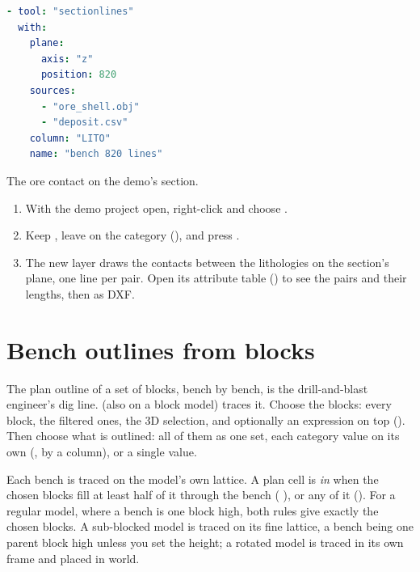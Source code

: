 \begin{lstlisting}[language=yaml]
- tool: "sectionlines"
  with:
    plane:
      axis: "z"
      position: 820
    sources:
      - "ore_shell.obj"
      - "deposit.csv"
    column: "LITO"
    name: "bench 820 lines"
\end{lstlisting}

\begin{tryit}
The ore contact on the demo's section.
\begin{enumerate}
\item With the demo project open, right-click  and choose
  .
\item Keep , leave  on the category (), and press
  .
\item The new layer draws the contacts between the lithologies on the section's plane, one line per
  pair. Open its attribute table () to see the pairs and their lengths, then
   as DXF.
\end{enumerate}
\end{tryit}

\section{Bench outlines from blocks}\label{sec:polygons-outlines}

The plan outline of a set of blocks, bench by bench, is the drill-and-blast engineer's dig line.
 (also  on a block
model) traces it. Choose the blocks: every block, the filtered ones, the 3D selection, and optionally
an expression on top (). Then choose what is outlined: all of them as one set, each
category value on its own (, by a column), or a single value.

Each bench is traced on the model's own lattice. A plan cell is \emph{in} when the chosen blocks fill
at least half of it through the bench ( ), or any of it (). For a regular
model, where a bench is one block high, both rules give exactly the chosen blocks. A sub-blocked
model is traced on its fine lattice, a bench being one parent block high unless you set the
 height; a rotated model is traced in its own frame and placed in world.

